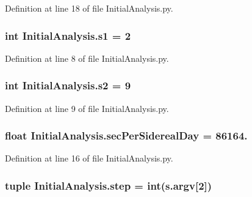 Definition at line 18 of file Initial\-Analysis.\-py.

\hypertarget{namespace_initial_analysis_a0724f8dbb19686d2c6d61dfa779df462}{
\subsubsection[{s1}]{\setlength{\rightskip}{0pt plus 5cm}int Initial\-Analysis.\-s1 = 2}}\label{namespace_initial_analysis_a0724f8dbb19686d2c6d61dfa779df462}


Definition at line 8 of file Initial\-Analysis.\-py.

\hypertarget{namespace_initial_analysis_a301d3f25d37a34b53b450ac9f7e20b74}{
\subsubsection[{s2}]{\setlength{\rightskip}{0pt plus 5cm}int Initial\-Analysis.\-s2 = 9}}\label{namespace_initial_analysis_a301d3f25d37a34b53b450ac9f7e20b74}


Definition at line 9 of file Initial\-Analysis.\-py.

\hypertarget{namespace_initial_analysis_a941e2c2dea67574aa0bb60b880233ba3}{
\subsubsection[{sec\-Per\-Sidereal\-Day}]{\setlength{\rightskip}{0pt plus 5cm}float Initial\-Analysis.\-sec\-Per\-Sidereal\-Day = 86164.}}\label{namespace_initial_analysis_a941e2c2dea67574aa0bb60b880233ba3}


Definition at line 16 of file Initial\-Analysis.\-py.

\hypertarget{namespace_initial_analysis_a44db668c8ccdc80acc9e630ba414298a}{
\subsubsection[{step}]{\setlength{\rightskip}{0pt plus 5cm}tuple Initial\-Analysis.\-step = int(s.\-argv\mbox{[}2\mbox{]})}}\label{namespace_initial_analysis_a44db668c8ccdc80acc9e630ba414298a}


